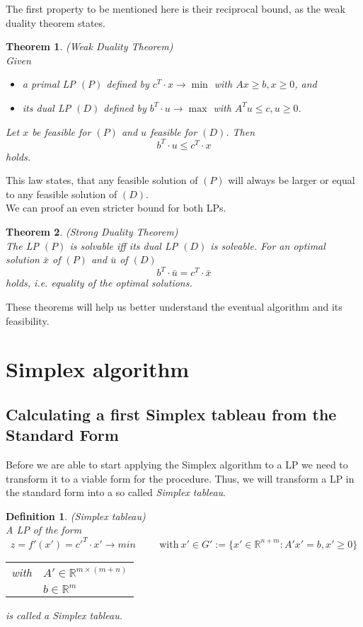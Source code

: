 \documentclass[a4paper, 11pt]{article}
\makeatletter
\newtheorem{mydef}{Definition}
\newtheorem{theorem}{Theorem}
\renewenvironment{quotation}
{\list{}{\listparindent=1.5em
		\itemindent=0pt
		\parsep\z@ \@plus\p@}%
	\item\relax}
{\endlist}
\makeatother
\begin{document}
The first property to be mentioned here is their reciprocal bound, as the weak duality theorem states.
\begin{theorem}(Weak Duality Theorem)\\
	Given 
	\begin{itemize}
		\item a primal LP $(P)$ defined by $c^T\cdot x \rightarrow \min$ with $Ax\geq b, x\geq 0$, and
		\item its dual LP $(D)$ defined by $b^T\cdot u \rightarrow \max$ with $A^Tu\leq c, u\geq 0$.
	\end{itemize} 
	Let $x$ be feasible for $(P)$ and $u$ feasible for $(D)$. Then
	\begin{equation*}
		b^T\cdot u \leq c^T\cdot x
	\end{equation*}
	holds.
\end{theorem}
This law states, that any feasible solution of $(P)$ will always be larger or equal to any feasible solution of $(D)$.\\
We can proof an even stricter bound for both LPs.
\begin{theorem}(Strong Duality Theorem)\\
	The LP $(P)$ is solvable iff its dual LP $(D)$ is solvable. For an optimal solution $\bar{x}$ of $(P)$ and $\bar{u}$ of $(D)$
	\begin{equation*}
		b^T\cdot \bar{u}= c^T\cdot \bar{x}
	\end{equation*}
	holds, i.e. equality of the optimal solutions.
\end{theorem}

These theorems will help us better understand the eventual algorithm and its feasibility.

\section{Simplex algorithm}
\subsection{Calculating a first Simplex tableau from the Standard Form}
Before we are able to start applying the Simplex algorithm to a LP we need to transform it to a viable form for the procedure. Thus, we will transform a LP in the standard form into a so called \textit{Simplex tableau}. 
\begin{mydef}(Simplex tableau)\\
	A LP of the form
	\begin{equation}
		\label{tableau definition}
		z = f'(x') = c'^T \cdot x' \rightarrow min
		\hspace{1cm} \text{with}\ x' \in G':=\{ x' \in \mathbb{R}^{n+m}: A'x' = b, x' \geq 0\}
	\end{equation}
	\begin{quotation}
		\begin{tabular}{rl}
			with &$ A'\in \mathbb{R}^{m\times (m+n)} $\\
			&$ b\in \mathbb{R}^m $
		\end{tabular}
	\end{quotation}
	is called a \emph{Simplex tableau}.
\end{mydef}
\end{document}
